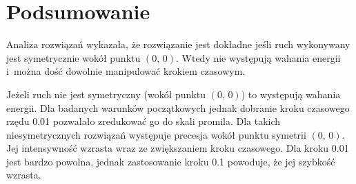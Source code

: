 \documentclass[a4paper; 12pt]{article}
\begin{document}
\section{Podsumowanie}

Analiza rozwiązań wykazała, że rozwiązanie jest dokładne jeśli ruch wykonywany
jest symetrycznie wokół punktu $(0,\,0)$.
Wtedy nie występują wahania energii i~można dość dowolnie manipulować krokiem
czasowym.

Jeżeli ruch nie jest symetryczny (wokół punktu $(0,\,0)$) to występują wahania
energii.
Dla badanych warunków początkowych jednak dobranie kroku czasowego rzędu
\num{0.01} pozwalało zredukować go do skali promila.
Dla takich niesymetrycznych rozwiązań występuje precesja wokół punktu symetrii $(0,\,0)$.
Jej intensywność wzrasta wraz ze zwiększaniem kroku czasowego.
Dla kroku \num{0.01} jest bardzo powolna, jednak zastosowanie kroku \num{0.1}
powoduje, że jej szybkość wzrasta.

\end{document}
